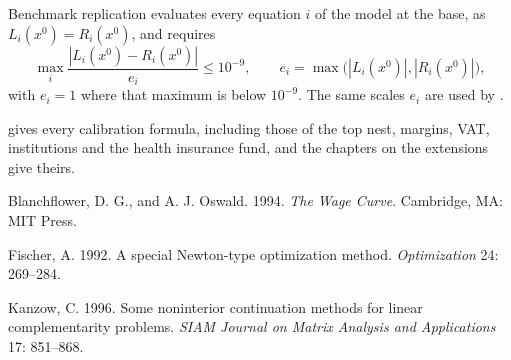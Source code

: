 Benchmark replication evaluates every equation $i$ of the model at the base,
as $L_i(x^0) = R_i(x^0)$, and requires
\begin{equation*}
\max_i \frac{|L_i(x^0) - R_i(x^0)|}{e_i} \le 10^{-9}, \qquad
e_i = \max\bigl(|L_i(x^0)|, |R_i(x^0)|\bigr),
\end{equation*}
with $e_i = 1$ where that maximum is below $10^{-9}$. The same scales $e_i$ are
used by .

 gives every calibration formula, including those of
the top nest, margins, VAT, institutions and the health insurance fund, and the
chapters on the extensions give theirs.


\begin{list}{}{\setlength{\leftmargin}{2em}\setlength{\itemindent}{-2em}%
  \setlength{\itemsep}{2pt}\setlength{\parsep}{0pt}}
\item Blanchflower, D. G., and A. J. Oswald. 1994. \textit{The Wage Curve}.
Cambridge, MA: MIT Press.
\item Fischer, A. 1992. A special Newton-type optimization method.
\textit{Optimization} 24: 269--284.
\item Kanzow, C. 1996. Some noninterior continuation methods for linear
complementarity problems. \textit{SIAM Journal on Matrix Analysis and
Applications} 17: 851--868.
\end{list}


\begin{alsosee}
\end{alsosee}
